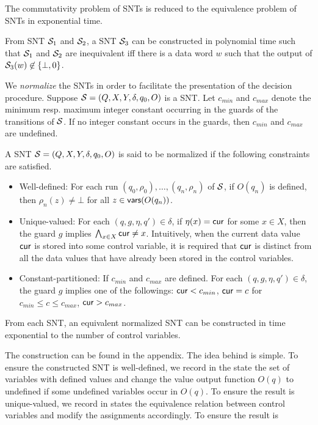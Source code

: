 \begin{proposition}\label{prop-snt-cmm-to-eqv}
The commutativity problem of SNTs is reduced to the equivalence problem of SNTs in exponential time. 
\end{proposition}

\begin{proposition}\label{prop-snt-eqv-to-nzero}
From SNT ${\mathcal{S} }_1$ and ${\mathcal{S} }_2$, a SNT ${\mathcal{S} }_3$ can be constructed in polynomial time such that ${\mathcal{S} }_1$ and ${\mathcal{S} }_2$ are inequivalent iff there is a data word $w$ such that the output of ${\mathcal{S} }_3(w) \not\in \{\bot,0\}$. 
\end{proposition}



We \emph{normalize} the SNTs in order to facilitate the presentation of the decision procedure.
Suppose ${\mathcal{S} }=(Q,X,Y,\delta,q_0,O)$ is a SNT. Let $c_{min}$ and $c_{max}$ denote the minimum resp. maximum integer constant occurring in the guards of the transitions of ${\mathcal{S} }$. If no integer constant occurs in the guards, then $c_{min}$ and $c_{max}$ are undefined.

A SNT ${\mathcal{S} }=(Q,X,Y,\delta,q_0,O)$ is said to be normalized if the following constraints are satisfied.
\begin{itemize}
	\item Well-defined: For each run $(q_0,\rho_0),\dots,(q_n,\rho_n)$ of ${\mathcal{S} }$, if $O(q_n)$ is defined, then $\rho_n(z)\neq\bot$ for all  $z\in \mathsf{vars}(O(q_n))$.
	\item Unique-valued: For each $(q,g,\eta,q') \in \delta$, if $\eta(x)=\mathsf{cur}$ for some $x \in X$, then the guard $g$ implies $\bigwedge_{x \in X} \mathsf{cur} \neq x$.  Intuitively, when the current data value $\mathsf{cur}$ is stored into some control variable, it is required that $\mathsf{cur}$ is distinct from all the data values that have already been stored in the control variables.
	\item Constant-partitioned: If $c_{min}$ and $c_{max}$ are defined. For each $(q, g, \eta, q') \in \delta$, the guard $g$ implies one of the followings: $\mathsf{cur} < c_{min}$, $\mathsf{cur} = c$ for $c_{min} \le c \le c_{max}$, $\mathsf{cur} > c_{max}$. 
\end{itemize}


\begin{proposition}\label{prop-snt-norm}
	From each SNT, an equivalent normalized SNT can be constructed in time exponential to the number of control variables. 
\end{proposition}
The construction can be found in the appendix. The idea behind is simple. To ensure the constructed SNT is well-defined, we record in the state the set of variables with defined values and change the value output function $O(q)$ to undefined if some undefined variables occur in $O(q)$. To ensure the result is unique-valued, we record in states the equivalence relation between control variables and modify the assignments accordingly. To ensure the result is 